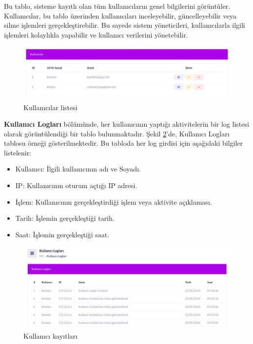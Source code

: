 Bu tablo, sisteme kayıtlı olan tüm kullanıcıların genel bilgilerini görüntüler. Kullanıcılar, bu tablo üzerinden kullanıcıları inceleyebilir, güncelleyebilir veya silme işlemleri gerçekleştirebilir. Bu sayede sistem yöneticileri, kullanıcılarla ilgili işlemleri kolaylıkla yapabilir ve kullanıcı verilerini yönetebilir.
\begin{figure}[ht]
	\centering
	\includegraphics[width=0.7\linewidth]{images/users.jpeg}
	\caption{Kullanıcılar listesi}
	\label{fig:users}
\end{figure}

\textbf{Kullanıcı Logları} bölümünde, her kullanıcının yaptığı aktivitelerin bir log listesi olarak görüntülendiği bir tablo bulunmaktadır. Şekil \ref{fig:log}'de, Kullanıcı Logları tablosu örneği gösterilmektedir.
Bu tabloda her log girdisi için aşağıdaki bilgiler listelenir:
\begin{itemize}
	\item Kullanıcı: İlgili kullanıcının adı ve Soyadı.
	\item IP: Kullanıcının oturum açtığı IP adresi.
	\item İşlem: Kullanıcının gerçekleştirdiği işlem veya aktivite açıklaması.
	\item Tarih: İşlemin gerçekleştiği tarih.
	\item Saat: İşlemin gerçekleştiği saat.
\end{itemize}

\begin{figure}[ht]
	\centering
	\includegraphics[width=0.7\linewidth]{images/log.jpeg}
	\caption{Kullanıcı kayıtları}
	\label{fig:log}
\end{figure}

